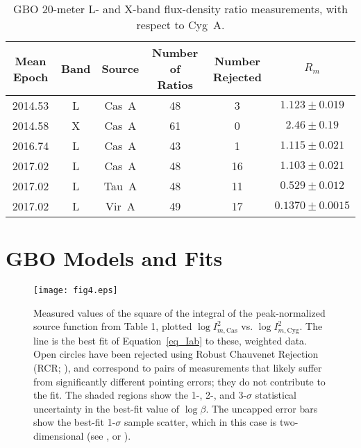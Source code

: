 \documentclass[fleqn,usenatbib]{mnras}
\newcommand{\Imcyg}{\mbox{$I^2_{m,\mathrm{Cyg}}$}}
\newcommand{\Imcas}{\mbox{$I^2_{m,\mathrm{Cas}}$}}
\begin{document}
\begin{table*}
\caption{GBO 20-meter L- and X-band flux-density ratio measurements, with respect to Cyg~A.}\label{tab3}
\centering
\begin{tabular}{c c c c c c}
\hline 
\hline 
Mean Epoch & Band & Source & Number of Ratios & Number Rejected & $R_m$ \\
\hline 
\hline 
2014.53 & L & Cas~A & 48 & 3  & $1.123\pm0.019$	\\
2014.58 & X & Cas~A & 61 & 0  & $2.46\pm0.19$ \\
2016.74 & L & Cas~A & 43 & 1  & $1.115\pm0.021$	\\
2017.02 & L & Cas~A & 48 & 16 & $1.103\pm0.021$ \\
2017.02 & L & Tau~A & 48 & 11 & $0.529\pm0.012$ \\
2017.02 & L & Vir~A & 49 & 17 & $0.1370\pm0.0015$ \\
\hline 
\end{tabular}
\end{table*}

\section{GBO Models and Fits}\label{gbomodel}

\begin{figure}
\begin{center}
\texttt{[image: fig4.eps]}
\caption{Measured values of the square of the integral of the peak-normalized source function from Table 1, plotted $\log\Imcas$ vs. $\log\Imcyg$.  The line is the best fit of Equation~\ref{eq_Iab} to these, weighted data.  Open circles have been rejected using Robust Chauvenet Rejection (RCR; \citealt{m17}), and correspond to pairs of measurements that likely suffer from significantly different pointing errors; they do not contribute to the fit.  The shaded regions show the 1-, 2-, and 3-$\sigma$ statistical uncertainty in the best-fit value of $\log\beta$.  The uncapped error bars show the best-fit 1-$\sigma$ sample scatter, which in this case is two-dimensional (see \citealt{t11}, or \citealt{r01}).}
\label{fig_int2}
\end{center}
\end{figure} 
\end{document}
